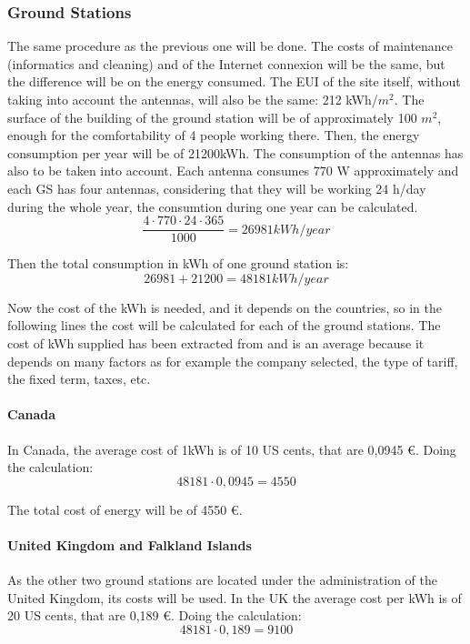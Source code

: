\subsubsection{Ground Stations}
The same procedure as the previous one will be done. The costs of maintenance (informatics and cleaning) and of the Internet connexion will be the same, but the difference will be on the energy consumed. The EUI of the site itself, without taking into account the antennas, will also be the same: 212 kWh/$m^2$. The surface of the building of the ground station will be of approximately 100 $m^2$, enough for the comfortability of 4 people working there. Then, the energy consumption per year will be of 21200kWh. The consumption of the antennas has also to be taken into account. Each antenna consumes 770 W approximately and each GS has four antennas, considering that they will be working 24 h/day during the whole year, the consumtion during one year can be calculated.
\begin{equation}
\frac{4 \cdot 770 \cdot 24 \cdot 365}{1000}=26981 kWh/year 
\end{equation}

Then the total consumption in kWh of one ground station is:
\begin{equation}
26981+21200=48181 kWh/year
\end{equation}

Now the cost of the kWh is needed, and it depends on the countries, so in the following lines the cost will be calculated for each of the ground stations. The cost of kWh supplied has been extracted from \cite{OVO} and is an average because it depends on many factors as for example the company selected, the type of tariff, the fixed term, taxes, etc.
 
\paragraph{Canada}
In Canada, the average cost of 1kWh is of 10 US cents, that are 0,0945 \euro. Doing the calculation:
\begin{equation}
48181\cdot 0,0945= 4550
\end{equation}

The total cost of energy will be of 4550 \euro.

\paragraph{United Kingdom and Falkland Islands}
As the other two ground stations are located under the administration of the United Kingdom, its costs will be used. In the UK the average cost per kWh is of 20 US cents, that are 0,189 \euro. Doing the calculation: 
\begin{equation}
48181\cdot 0,189= 9100
\end{equation}


